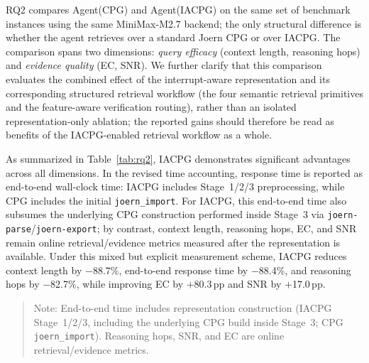 \documentclass[a4paper,UKenglish,cleveref, autoref, thm-restate]{lipics-v2021}
\begin{document}
RQ2 compares Agent(CPG) and Agent(IACPG) on the same set of benchmark instances using the same MiniMax-M2.7 backend; the only structural difference is whether the agent retrieves over a standard Joern CPG or over IACPG. The comparison spans two dimensions: \textit{query efficacy} (context length, reasoning hops) and \textit{evidence quality} (EC, SNR). We further clarify that this comparison evaluates the combined effect of the interrupt-aware representation and its corresponding structured retrieval workflow (the four semantic retrieval primitives and the feature-aware verification routing), rather than an isolated representation-only ablation; the reported gains should therefore be read as benefits of the IACPG-enabled retrieval workflow as a whole.

As summarized in Table~\ref{tab:rq2}, IACPG demonstrates significant advantages across all dimensions. In the revised time accounting, response time is reported as end-to-end wall-clock time: IACPG includes Stage~1/2/3 preprocessing, while CPG includes the initial \texttt{joern\_import}. For IACPG, this end-to-end time also subsumes the underlying CPG construction performed inside Stage~3 via \texttt{joern-parse}/\texttt{joern-export}; by contrast, context length, reasoning hops, EC, and SNR remain online retrieval/evidence metrics measured after the representation is available. Under this mixed but explicit measurement scheme, IACPG reduces context length by $-$88.7\%, end-to-end response time by $-$88.4\%, and reasoning hops by $-$82.7\%, while improving EC by $+$80.3\,pp and SNR by $+$17.0\,pp.

\begin{table}[H]
  \centering
  \caption{RQ2: Standard CPG vs.\ \iacpg in query efficacy and evidence quality.}
  \label{tab:rq2}
  \begin{quote}
    \footnotesize Note: End-to-end time includes representation construction (IACPG Stage~1/2/3, including the underlying CPG build inside Stage~3; CPG \texttt{joern\_import}). Reasoning hops, SNR, and EC are online retrieval/evidence metrics.
  \end{quote}
\end{table}
\end{document}
